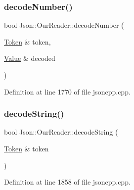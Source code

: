 \subsubsection{\texorpdfstring{decode\+Number()}{decodeNumber()}\hspace{0.1cm}{\footnotesize\ttfamily [2/2]}}
{\footnotesize\ttfamily bool Json\+::\+Our\+Reader\+::decode\+Number (\begin{DoxyParamCaption}\item[{\hyperlink{class_json_1_1_our_reader_1_1_token}{Token} \&}]{token,  }\item[{\hyperlink{class_json_1_1_value}{Value} \&}]{decoded }\end{DoxyParamCaption})\hspace{0.3cm}{\ttfamily [private]}}



Definition at line 1770 of file jsoncpp.\+cpp.

\hypertarget{class_json_1_1_our_reader_a34e31d8b8399b7ad493359702b6de6c9}{}\label{class_json_1_1_our_reader_a34e31d8b8399b7ad493359702b6de6c9} 
\subsubsection{\texorpdfstring{decode\+String()}{decodeString()}\hspace{0.1cm}{\footnotesize\ttfamily [1/2]}}
{\footnotesize\ttfamily bool Json\+::\+Our\+Reader\+::decode\+String (\begin{DoxyParamCaption}\item[{\hyperlink{class_json_1_1_our_reader_1_1_token}{Token} \&}]{token }\end{DoxyParamCaption})\hspace{0.3cm}{\ttfamily [private]}}



Definition at line 1858 of file jsoncpp.\+cpp.

\hypertarget{class_json_1_1_our_reader_a5046dfa5d43b1770a091aac0a63a9f4b}{}\label{class_json_1_1_our_reader_a5046dfa5d43b1770a091aac0a63a9f4b} 
